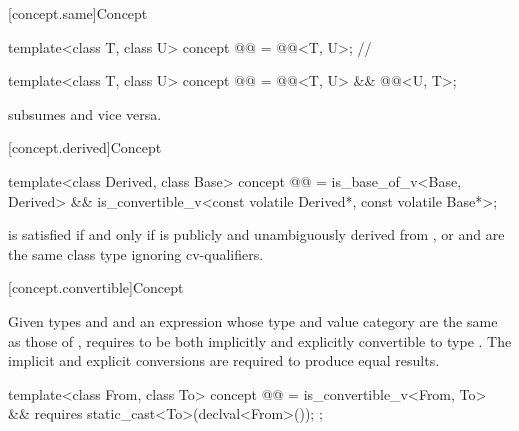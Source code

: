 [concept.same]{Concept }

\begin{itemdecl}
template<class T, class U>
  concept @@ = @@<T, U>;       // \expos

template<class T, class U>
  concept @@ = @@<T, U> && @@<U, T>;
\end{itemdecl}

\begin{itemdescr}
\pnum
\begin{note}
 subsumes  and
vice versa.
\end{note}
\end{itemdescr}

[concept.derived]{Concept }

\begin{itemdecl}
template<class Derived, class Base>
  concept @@ =
    is_base_of_v<Base, Derived> &&
    is_convertible_v<const volatile Derived*, const volatile Base*>;
\end{itemdecl}

\begin{itemdescr}
\pnum
\begin{note}
 is satisfied if and only if
 is publicly and unambiguously derived from , or
 and  are the same class type ignoring cv-qualifiers.
\end{note}
\end{itemdescr}

[concept.convertible]{Concept }

\pnum
Given types  and  and
an expression 
whose type and value category are the same as those of ,
 requires 
to be both implicitly and explicitly convertible to type .
The implicit and explicit conversions are required to produce equal
results.

\begin{itemdecl}
template<class From, class To>
  concept @@ =
    is_convertible_v<From, To> &&
    requires {
      static_cast<To>(declval<From>());
    };
\end{itemdecl}

